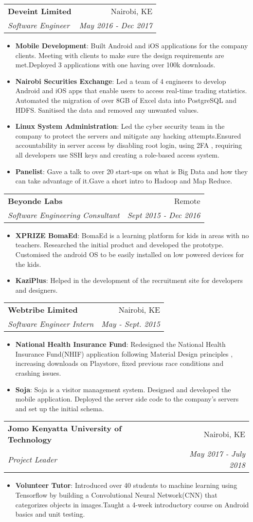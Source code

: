 \documentclass[letterpaper,11pt]{article}
\makeatletter
\newcommand{\resumeItem}[2]{
  \item\small{
    \textbf{#1}{: #2 \vspace{-2pt}}
  }
}
\newcommand{\resumeSubheading}[4]{
  \vspace{-1pt}\item
    \begin{tabular*}{0.97\textwidth}{l@{\extracolsep{\fill}}r}
      \textbf{#1} & #2 \\
      \textit{\small#3} & \textit{\small #4} \\
    \end{tabular*}\vspace{-5pt}
}
\newcommand{\resumeItemListStart}{\begin{itemize}}
\newcommand{\resumeItemListEnd}{\end{itemize}\vspace{-5pt}}
\makeatother
\begin{document}
	\resumeSubheading
      {Deveint Limited}{Nairobi, KE}
      {Software Engineer}{May 2016 - Dec 2017}
      \resumeItemListStart
      \resumeItem{Mobile Development}
          {Built Android and iOS applications for the company clients. Meeting with clients to make sure the design requirements are met.Deployed 3 applications with one having over 100k downloads.}
        \resumeItem{Nairobi Securities Exchange}
          {Led a team of 4 engineers to develop Android and iOS apps that enable users to access real-time trading statistics. Automated the migration of over 8GB of Excel data into PostgreSQL and HDFS. Sanitised the data and removed any unwanted values.}
        \resumeItem{Linux System Administration}
          {Led the cyber security team in the company to protect the servers and mitigate any hacking attempts.Ensured accountability in server access by disabling root login, using 2FA , requiring all
developers use SSH keys and creating a role-based access system.}
        \resumeItem{Panelist}
          {Gave a talk to over 20 start-ups on what is Big Data and how they can
take advantage of it.Gave a short intro to Hadoop and Map Reduce.}
      \resumeItemListEnd
      
    \resumeSubheading
      {Beyonde Labs}{Remote}
      {Software Engineering Consultant}{Sept 2015 - Dec 2016}
      \resumeItemListStart
        \resumeItem{XPRIZE BomaEd}
          {BomaEd is a learning platform for kids in areas with no teachers. Researched the initial product and developed the prototype. Customised the android OS to be easily installed on low powered devices for the kids.}
        \resumeItem{KaziPlus}
          {Helped in the development of the recruitment site for developers and designers.}
      \resumeItemListEnd
      
    \resumeSubheading
      {Webtribe Limited}{Nairobi, KE}
      {Software Engineer Intern}{May - Sept. 2015}
      \resumeItemListStart
        \resumeItem{National Health Insurance Fund}
          {Redesigned the National Health Insurance Fund(NHIF) application following Material
Design principles , increasing downloads on Playstore, fixed previous race
conditions and crashing issues.}
        \resumeItem{Soja}
          {Soja is a visitor management system. Designed and developed the mobile application. Deployed the server side code to the company's servers and set up the initial schema.}
      \resumeItemListEnd
    \resumeSubheading
      {Jomo Kenyatta University of Technology}{Nairobi, KE}
      {Project Leader}{May 2017 - July 2018}
      \resumeItemListStart
        \resumeItem{Volunteer Tutor}
          {Introduced over 40 students to machine learning using Tensorflow by building a
Convolutional Neural Network(CNN) that categorizes objects in images.Taught a 4-week introductory course on Android basics and unit testing.}
      \resumeItemListEnd
\end{document}
